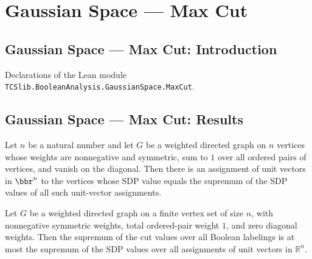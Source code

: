 \section{Gaussian Space --- Max Cut}
\subsection*{Gaussian Space --- Max Cut: Introduction}

Declarations of the Lean module \texttt{TCSlib.BooleanAnalysis.GaussianSpace.MaxCut}.

\subsection*{Gaussian Space --- Max Cut: Results}

\begin{theorem}
\label{BooleanAnalysis.GaussianSpace.MaxCut.exists_sdp_optimizer}
\leanok
{}
Let $n$ be a natural number and let $G$ be a weighted directed graph on $n$ vertices
whose weights are nonnegative and symmetric, sum to $1$ over all ordered pairs of
vertices, and vanish on the diagonal. Then there is an assignment of unit vectors in
$\bbr^n$ to the vertices whose SDP value equals the supremum of the SDP values of all
such unit-vector assignments.
\end{theorem}

\begin{theorem}
\label{BooleanAnalysis.GaussianSpace.MaxCut.optimum_le_sdpOptimum}
\leanok
{}
Let $G$ be a weighted directed graph on a finite vertex set of size $n$, with
nonnegative symmetric weights, total ordered-pair weight $1$, and zero diagonal weights.
Then the supremum of the cut values over all Boolean labelings is at most the supremum
of the SDP values over all assignments of unit vectors in $\mathbb R^n$.
\end{theorem}

